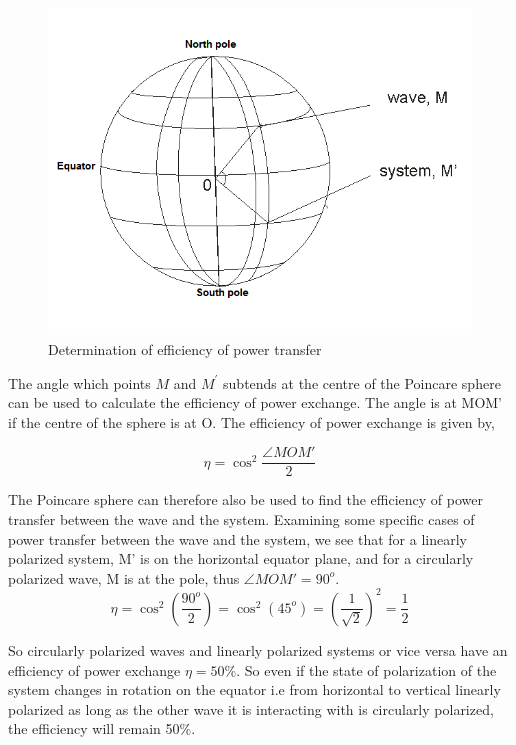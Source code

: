 \begin{figure}
	\centering
	\includegraphics[width=1\linewidth]{./graphics/power}
	\caption{Determination of efficiency of power transfer}
	\label{fig:power}
\end{figure}

The angle which points $M$ and $M^'$ subtends at the centre of the Poincare sphere can be used to calculate the efficiency of power exchange.
The angle is at MOM' if the centre of the sphere is at O. The efficiency of power exchange is given by,

\[\eta = \cos^2 {\frac{ \angle  MOM' }{2}}  \]

The Poincare sphere can therefore also be used to find the efficiency of power transfer between the wave and the system. Examining some specific cases of power transfer between the wave and the system, we see that for a linearly polarized system, M' is on the horizontal equator plane, and for a circularly polarized wave, M is at the pole, thus $\angle MOM' = 90^o$.
\[ \eta= \cos ^2(\frac{90^o}{2}) =\cos ^2(45^o) =(\frac{1}{\sqrt{2}})^2  = \frac{1}{2}\]

So circularly polarized waves and linearly polarized systems or vice versa have an efficiency of power exchange $ \eta=  50\% $. So even if the state of polarization of the system changes in rotation on the equator i.e from horizontal to vertical linearly polarized as long as the other wave it is interacting with is circularly polarized, the efficiency will remain 50\%.

